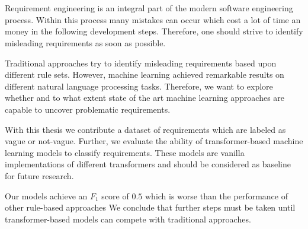 \chapter{\abstractname}

Requirement engineering is an integral part of the modern software engineering process.
Within this process many mistakes can occur which cost a lot of time an money in the following development steps.
Therefore, one should strive to identify misleading requirements as soon as possible.

Traditional approaches try to identify misleading requirements based upon different rule sets.
However, machine learning achieved remarkable results on different natural language processing tasks.
Therefore, we want to explore whether and to what extent state of the art machine learning approaches are capable to uncover problematic requirements.

With this thesis we contribute a dataset of requirements which are labeled as vague or not-vague.
Further, we evaluate the ability of transformer-based machine learning models to classify requirements.
These models are vanilla implementations of different transformers and should be considered as baseline for future research.

Our models achieve an $F_1$ score of $0.5$ which is worse than the performance of other rule-based approaches
We conclude that further steps must be taken until transformer-based models can compete with traditional approaches.
